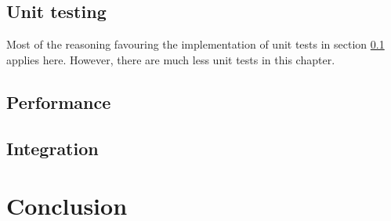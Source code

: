 \subsection{Unit testing}
\label{sec:sound-unittest}

Most of the reasoning favouring the implementation of unit
tests in section \ref{sec:sound-unittest} applies here. However, there
are much less unit tests in this chapter.

\subsection{Performance}

\cite{knuth74structured}

\subsection{Integration}
\label{sec:graph-integration}

\section{Conclusion}

